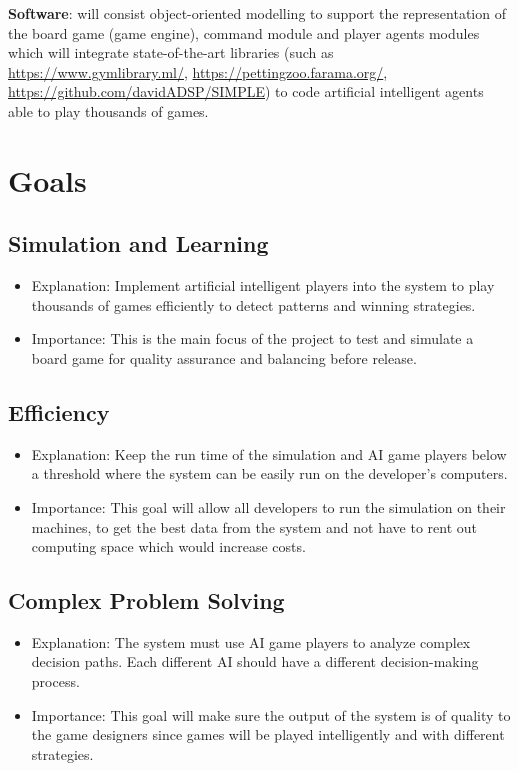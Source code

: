 \documentclass{article}
\begin{document}
\textbf{Software}: will consist object-oriented modelling to support the representation
of the board game (game engine), command module and player agents modules which will integrate state-of-the-art libraries (such as
\url{https://www.gymlibrary.ml/}, \url{https://pettingzoo.farama.org/}, \url{https://github.com/davidADSP/SIMPLE}) to code artificial intelligent agents able to play thousands of
games.

\section{Goals}
\subsection{Simulation and Learning}
\begin{itemize}
\item Explanation: Implement artificial intelligent players into the system to play thousands of games efficiently to detect patterns and winning strategies.
\item Importance: This is the main focus of the project to test and simulate a board game for quality assurance and balancing before release.
\end{itemize}

\subsection{Efficiency}
\begin{itemize}
\item Explanation: Keep the run time of the simulation and AI game players below a threshold where the system can be easily run on the developer's computers.
\item Importance: This goal will allow all developers to run the simulation on their machines, to get the best data from the system and not have to rent out computing space which would increase costs.
\end{itemize}

\subsection{Complex Problem Solving}
\begin{itemize}
\item Explanation: The system must use AI game players to analyze complex decision paths. Each different AI should have a different decision-making process.
\item Importance: This goal will make sure the output of the system is of quality to the game designers since games will be played intelligently and with different strategies.
\end{itemize}
\end{document}
